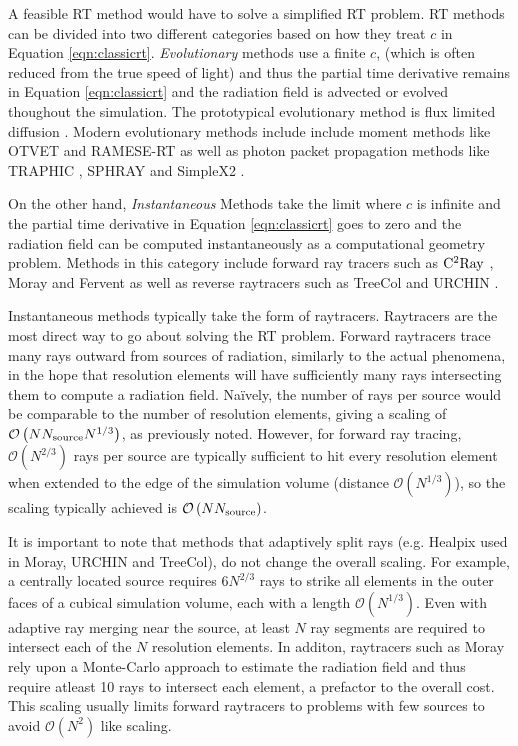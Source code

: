 \documentclass[fleq,usenatbib]{mnras}
\newcommand{\bigO}[1]{\mathcal{O}\left(#1\right)}
\newcommand{\NS}{N_{\rm source}}
\begin{document}
A feasible RT method would have to solve a simplified RT problem. RT methods 
can be divided into two different categories based on how they treat $c$ in 
Equation \ref{eqn:classicrt}. \textit{Evolutionary} methods use a finite $c$, 
(which is often reduced from the true speed of light) and thus the partial 
time derivative remains in Equation \ref{eqn:classicrt} and the radiation 
field is advected or evolved thoughout the simulation. The prototypical 
evolutionary method is flux limited diffusion \citep{levermorePomraning81}. 
Modern evolutionary methods include include moment methods like OTVET 
\citep{gnedinAbel01} and RAMESE-RT \citep{rosdahlTeyssier15} as well as photon 
packet propagation methods like TRAPHIC \citep{pawlikSchaye08}, SPHRAY 
\citep{altayEt08} and SimpleX2 \citep{paardekooperEt10}.

On the other hand, \textit{Instantaneous} Methods take the limit where $c$ is 
infinite and the partial time derivative in Equation \ref{eqn:classicrt} goes 
to zero and the radiation field can be computed instantaneously as a 
computational geometry problem.  Methods in this category include forward ray 
tracers such as $\rm C^2Ray$ \citep{mellemaEt06a}, Moray \citep{wiseAbel11} 
and Fervent \citep{baczynskiEt15} as well as reverse raytracers such as 
TreeCol \citep{clarkEt12} and URCHIN \citep{altayTheuns13}. 

Instantaneous methods typically take the form of raytracers. Raytracers are 
the most direct way to go about solving the RT problem. Forward raytracers 
trace many rays outward from sources of radiation, similarly to the actual 
phenomena, in the hope that resolution elements will have sufficiently many 
rays intersecting them to compute a radiation field. Na\"ively, the number of 
rays per source would be comparable to the number of resolution elements, 
giving a scaling of $\bigO{N \NS N^{1/3}}$, as previously noted. However, for 
forward ray tracing, $\bigO{N^{2/3}}$ rays per source are typically sufficient 
to hit every resolution element when extended to the edge of the simulation 
volume (distance $\bigO{N^{1/3}}$), so the scaling typically achieved is 
$\bigO{N \NS}$.  

It is important to note that methods that adaptively split rays (e.g. Healpix 
\citep{gorskiEt05} used in Moray, URCHIN and TreeCol), do not change the 
overall scaling.  For example, a centrally located source requires $6 N^{2/3}$ 
rays to strike all elements in the outer faces of a cubical simulation volume, 
each with a length $\bigO{N^{1/3}}$. Even with adaptive ray merging near the 
source, at least $N$ ray segments are required to intersect each of the $N$ 
resolution elements. In additon, raytracers such as Moray rely upon a 
Monte-Carlo approach to estimate the radiation field and thus require atleast 
10 rays to intersect each element, a prefactor to the overall cost. This 
scaling usually limits forward raytracers to problems with few sources to 
avoid $\mathcal{O}(N^2)$ like scaling. 
\end{document}
